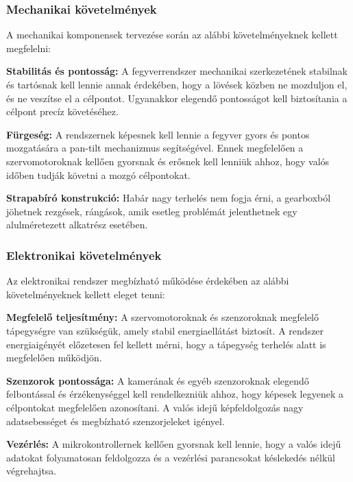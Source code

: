 \subsubsection*{Mechanikai követelmények} 

A mechanikai komponensek tervezése során az alábbi követelményeknek kellett megfelelni:
\begin{list}{}{}
	\item \textbf{Stabilitás és pontosság:}  A fegyverrendszer mechanikai szerkezetének stabilnak és tartósnak kell lennie annak érdekében, hogy a lövések közben ne mozduljon el, és ne veszítse el a célpontot. Ugyanakkor elegendő pontosságot kell biztosítania a célpont precíz követéséhez.
	\item \textbf{Fürgeség:} A rendszernek képesnek kell lennie a fegyver gyors és pontos mozgatására a pan-tilt mechanizmus segítségével. Ennek megfelelően a szervomotoroknak kellően gyorsnak és erősnek kell lenniük ahhoz, hogy valós időben tudják követni a mozgó célpontokat.
	\item \textbf{Strapabíró konstrukció:} Habár nagy terhelés nem fogja érni, a gearboxból jöhetnek rezgések, rángások, amik esetleg problémát jelenthetnek egy alulméretezett alkatrész esetében.
\end{list}

\subsubsection*{Elektronikai követelmények}

Az elektronikai rendszer megbízható működése érdekében az alábbi követelményeknek kellett eleget tenni:

\begin{list}{}{}
	\item \textbf{Megfelelő teljesítmény:}  A szervomotoroknak és szenzoroknak megfelelő tápegységre van szükségük, amely stabil energiaellátást biztosít. A rendszer energiaigényét előzetesen fel kellett mérni, hogy a tápegység terhelés alatt is megfelelően működjön.
	\item \textbf{Szenzorok pontossága:} A kamerának és egyéb szenzoroknak elegendő felbontással és érzékenységgel kell rendelkezniük ahhoz, hogy képesek legyenek a célpontokat megfelelően azonosítani. A valós idejű képfeldolgozás nagy adatsebességet és megbízható szenzorjeleket igényel.
	\item\textbf{ Vezérlés:} A mikrokontrollernek kellően gyorsnak kell lennie, hogy a valós idejű adatokat folyamatosan feldolgozza és a vezérlési parancsokat késlekedés nélkül végrehajtsa.
\end{list}


